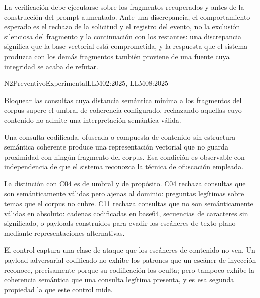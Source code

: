 La verificación debe ejecutarse sobre los fragmentos recuperados y antes de la construcción del prompt aumentado. Ante una discrepancia, el comportamiento esperado es el rechazo de la solicitud y el registro del evento, no la exclusión silenciosa del fragmento y la continuación con los restantes: una discrepancia significa que la base vectorial está comprometida, y la respuesta que el sistema produzca con los demás fragmentos también proviene de una fuente cuya integridad se acaba de refutar.


  {N2}{Preventivo}{Experimental}{LLM02:2025, LLM08:2025}

Bloquear las consultas cuya distancia semántica mínima a los fragmentos del corpus supere el umbral de coherencia configurado, rechazando aquellas cuyo contenido no admite una interpretación semántica válida.

Una consulta codificada, ofuscada o compuesta de contenido sin estructura semántica coherente produce una representación vectorial que no guarda proximidad con ningún fragmento del corpus. Esa condición es observable con independencia de que el sistema reconozca la técnica de ofuscación empleada.

La distinción con C04 es de umbral y de propósito. C04 rechaza consultas que son semánticamente válidas pero ajenas al dominio: preguntas legítimas sobre temas que el corpus no cubre. C11 rechaza consultas que no son semánticamente válidas en absoluto: cadenas codificadas en base64, secuencias de caracteres sin significado, o payloads construidos para evadir los escáneres de texto plano mediante representaciones alternativas.

El control captura una clase de ataque que los escáneres de contenido no ven. Un payload adversarial codificado no exhibe los patrones que un escáner de inyección reconoce, precisamente porque su codificación los oculta; pero tampoco exhibe la coherencia semántica que una consulta legítima presenta, y es esa segunda propiedad la que este control mide.

